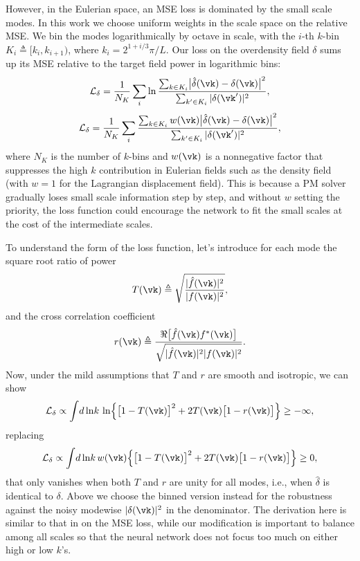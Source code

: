 \documentclass[modern, trackchanges, dvipsnames]{aastex631}
\renewcommand{\d}{d}
\newcommand{\cL}{\mathcal{L}}
\begin{document}
However, in the Eulerian space, an MSE loss is dominated by the small
scale modes.
In this work we choose uniform weights in the scale space on the
relative MSE.
We bin the modes logarithmically by  octave in scale, with
the $i$-th $k$-bin $K_i \triangleq [k_i, k_{i+1})$, where $k_i =
2^{1+i/3} \pi / L$.
Our loss on the overdensity field $\delta$ sums up its MSE relative to
the target field power in logarithmic bins:
%
\begin{equation}
\cL_\delta = \frac1{N_K} \sum_i \ln
\frac{\sum_{k \in K_i} \bigl| \hat\delta(\vk) - \delta(\vk) \bigr|^2}
     {\sum_{k' \in K_i} |\delta(\vk')|^2},
\end{equation}
%
\begin{equation}
\cL_\delta = \frac1{N_K} \sum_i
\frac{\sum_{k \in K_i} w(\vk)
      \bigl| \hat\delta(\vk) - \delta(\vk) \bigr|^2}
     {\sum_{k' \in K_i} |\delta(\vk')|^2},
\end{equation}
%
where $N_K$ is the number of $k$-bins and $w(\vk)$ is a nonnegative
factor that suppresses the high $k$ contribution in Eulerian fields such
as the density field (with $w=1$ for the Lagrangian displacement field).
This is because a PM solver gradually loses small scale information step
by step, and without $w$ setting the priority, the loss function could
encourage the network to fit the small scales at the cost of the
intermediate scales.

To understand the form of the loss function, let's introduce for each
mode the square root ratio of power
%
\begin{equation}
T(\vk) \triangleq
\sqrt{\frac{|\hat f(\vk)|^2}{|f(\vk)|^2}},
\end{equation}
%
and the cross correlation coefficient
%
\begin{equation}
r(\vk) \triangleq
\frac{\Re \bigl[ \hat f(\vk) f^*(\vk) \bigr]}
     {\sqrt{|\hat f(\vk)|^2 |f(\vk)|^2}}.
\end{equation}
%
Now, under the mild assumptions that $T$ and $r$ are smooth and
isotropic, we can show
%
\begin{equation}
\cL_\delta \propto \int \!\d\ln\!k\, \ln
\Bigl\{ \bigl[ 1 - T(\vk) \bigr]^2
  + 2 T(\vk) \bigl[ 1 - r(\vk) \bigr] \Bigr\} \geq -\infty,
\end{equation}
%
replacing
%
\begin{equation}
\cL_\delta \propto \int \!\d\ln\!k\, w(\vk)
\Bigl\{ \bigl[ 1 - T(\vk) \bigr]^2
  + 2 T(\vk) \bigl[ 1 - r(\vk) \bigr] \Bigr\} \geq 0,
\end{equation}
%
that only vanishes when both $T$ and $r$ are unity for all modes, i.e.,
when $\hat\delta$ is identical to $\delta$.
Above we choose the binned version instead for the robustness against
the noisy modewise $|\delta(\vk)|^2$ in the denominator.
The derivation here is similar to that in \citet{HeEtAl2019} on the MSE
loss, while our modification is important to balance among all scales so
that the neural network does not focus too much on either high or low
$k$'s.
\end{document}
